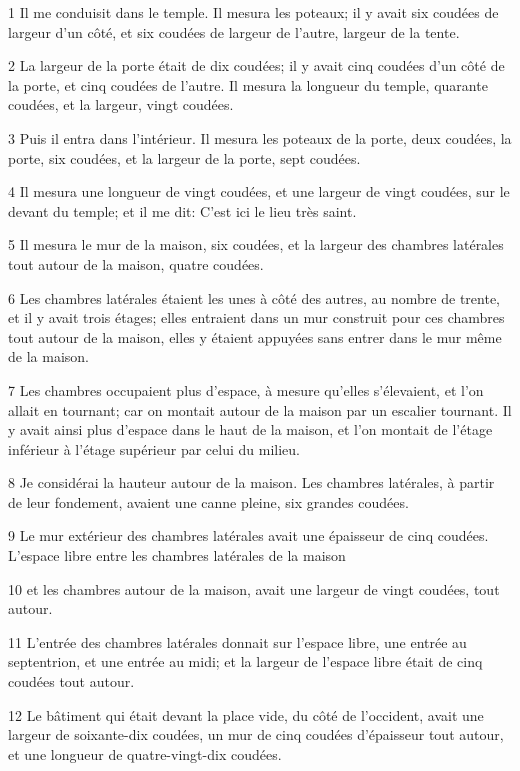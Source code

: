 \par 1 Il me conduisit dans le temple. Il mesura les poteaux; il y avait six coudées de largeur d'un côté, et six coudées de largeur de l'autre, largeur de la tente.
\par 2 La largeur de la porte était de dix coudées; il y avait cinq coudées d'un côté de la porte, et cinq coudées de l'autre. Il mesura la longueur du temple, quarante coudées, et la largeur, vingt coudées.
\par 3 Puis il entra dans l'intérieur. Il mesura les poteaux de la porte, deux coudées, la porte, six coudées, et la largeur de la porte, sept coudées.
\par 4 Il mesura une longueur de vingt coudées, et une largeur de vingt coudées, sur le devant du temple; et il me dit: C'est ici le lieu très saint.
\par 5 Il mesura le mur de la maison, six coudées, et la largeur des chambres latérales tout autour de la maison, quatre coudées.
\par 6 Les chambres latérales étaient les unes à côté des autres, au nombre de trente, et il y avait trois étages; elles entraient dans un mur construit pour ces chambres tout autour de la maison, elles y étaient appuyées sans entrer dans le mur même de la maison.
\par 7 Les chambres occupaient plus d'espace, à mesure qu'elles s'élevaient, et l'on allait en tournant; car on montait autour de la maison par un escalier tournant. Il y avait ainsi plus d'espace dans le haut de la maison, et l'on montait de l'étage inférieur à l'étage supérieur par celui du milieu.
\par 8 Je considérai la hauteur autour de la maison. Les chambres latérales, à partir de leur fondement, avaient une canne pleine, six grandes coudées.
\par 9 Le mur extérieur des chambres latérales avait une épaisseur de cinq coudées. L'espace libre entre les chambres latérales de la maison
\par 10 et les chambres autour de la maison, avait une largeur de vingt coudées, tout autour.
\par 11 L'entrée des chambres latérales donnait sur l'espace libre, une entrée au septentrion, et une entrée au midi; et la largeur de l'espace libre était de cinq coudées tout autour.
\par 12 Le bâtiment qui était devant la place vide, du côté de l'occident, avait une largeur de soixante-dix coudées, un mur de cinq coudées d'épaisseur tout autour, et une longueur de quatre-vingt-dix coudées.

